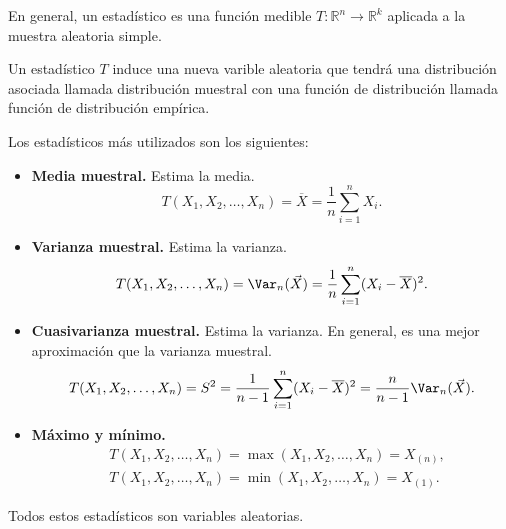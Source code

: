En general, un estadístico es una función medible $T: \mathbb{R}^n \to \mathbb{R}^k$ aplicada a la muestra aleatoria simple.

Un estadístico $T$ induce una nueva varible aleatoria que tendrá una distribución asociada llamada distribución muestral con una función de distribución llamada función de distribución empírica.

Los estadísticos más utilizados son los siguientes:
\begin{itemize}
    \item \textbf{Media muestral.}
          Estima la media.
          $$T(X_1, X_2, \dots, X_n) = \overline{X} = \frac{1}{n} \sum_{i=1}^n X_i.$$

    \item \textbf{Varianza muestral.}
          Estima la varianza.
          $$T(X_1, X_2, \dots, X_n) = \Var_n(\vec{X}) = \frac{1}{n} \sum_{i=1}^n (X_i - \overline{X})^2.$$

    \item \textbf{Cuasivarianza muestral.}
          Estima la varianza.
          En general, es una mejor aproximación que la varianza muestral.
          $$T(X_1, X_2, \dots, X_n) = S^2 = \frac{1}{n-1} \sum_{i=1}^n (X_i - \overline{X})^2 = \frac{n}{n-1} \Var_n(\vec{X}).$$

    \item \textbf{Máximo y mínimo.}
          \begin{align*}
               & T(X_1, X_2, \dots, X_n) = \max(X_1, X_2, \dots, X_n) = X_{(n)}, \\
               & T(X_1, X_2, \dots, X_n) = \min(X_1, X_2, \dots, X_n) = X_{(1)}.
          \end{align*}
\end{itemize}

\begin{note}
    Todos estos estadísticos son variables aleatorias.
\end{note}

